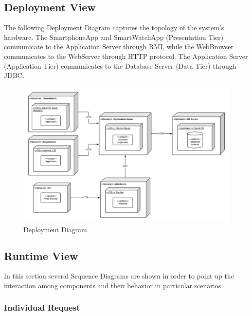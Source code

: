 \subsection{Deployment View}
The following Deployment Diagram captures the topology of the system's hardware.
The SmartphoneApp and SmartWatchApp (Presentation Tier) communicate to the Application Server through RMI, while the WebBrowser communicates to the WebServer through HTTP protocol. The Application Server (Application Tier) communicates to the Database Server (Data Tier) through JDBC.

\begin{figure}[H]
\centering
\includegraphics[scale=0.35]{Images/DeploymentDiagram.png}
\caption{Deployment Diagram.}
\end{figure}

\subsection{Runtime View}
In this section several Sequence Diagrams are shown in order to point up the interaction among components and their behavior in particular scenarios.

\subsubsection{Individual Request}

\subsubsection{}
\subsubsection{}


